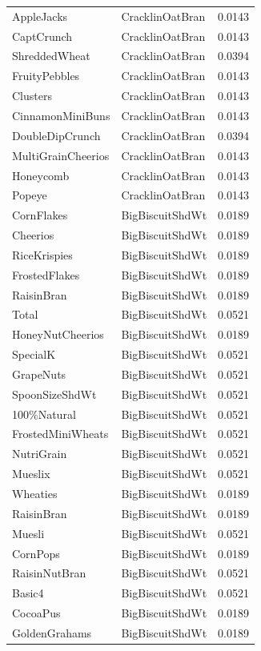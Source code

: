 \begin{table}[!htbp]
\begin{tabular}{lll}
AppleJacks & CracklinOatBran & 0.0143
\\
CaptCrunch & CracklinOatBran & 0.0143
\\
ShreddedWheat & CracklinOatBran & 0.0394
\\
FruityPebbles & CracklinOatBran & 0.0143
\\
Clusters & CracklinOatBran & 0.0143
\\
CinnamonMiniBuns & CracklinOatBran & 0.0143
\\
DoubleDipCrunch & CracklinOatBran & 0.0394
\\
MultiGrainCheerios & CracklinOatBran & 0.0143
\\
Honeycomb & CracklinOatBran & 0.0143
\\
Popeye & CracklinOatBran & 0.0143
\\
CornFlakes & BigBiscuitShdWt & 0.0189
\\
Cheerios & BigBiscuitShdWt & 0.0189
\\
RiceKrispies & BigBiscuitShdWt & 0.0189
\\
FrostedFlakes & BigBiscuitShdWt & 0.0189
\\
RaisinBran & BigBiscuitShdWt & 0.0189
\\
Total & BigBiscuitShdWt & 0.0521
\\
HoneyNutCheerios & BigBiscuitShdWt & 0.0189
\\
SpecialK & BigBiscuitShdWt & 0.0521
\\
GrapeNuts & BigBiscuitShdWt & 0.0521
\\
SpoonSizeShdWt & BigBiscuitShdWt & 0.0521
\\
100\%Natural & BigBiscuitShdWt & 0.0521
\\
FrostedMiniWheats & BigBiscuitShdWt & 0.0521
\\
NutriGrain & BigBiscuitShdWt & 0.0521
\\
Mueslix & BigBiscuitShdWt & 0.0521
\\
Wheaties & BigBiscuitShdWt & 0.0189
\\
RaisinBran & BigBiscuitShdWt & 0.0189
\\
Muesli & BigBiscuitShdWt & 0.0521
\\
CornPops & BigBiscuitShdWt & 0.0189
\\
RaisinNutBran & BigBiscuitShdWt & 0.0521
\\
Basic4 & BigBiscuitShdWt & 0.0521
\\
CocoaPus & BigBiscuitShdWt & 0.0189
\\
GoldenGrahams & BigBiscuitShdWt & 0.0189
\\

\end{tabular}
\end{table}

